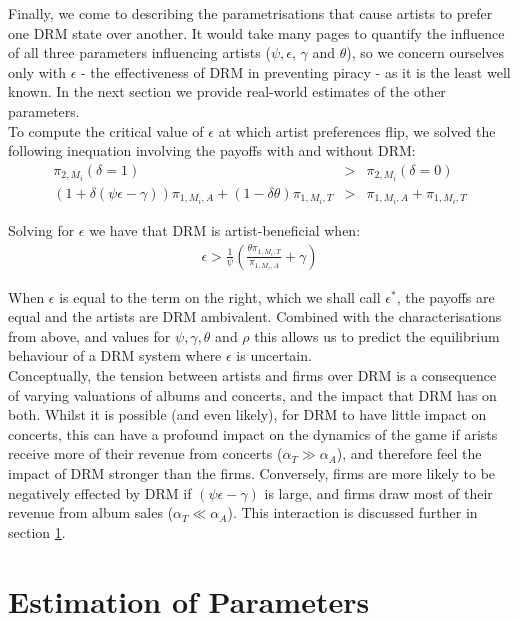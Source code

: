 \documentclass[a4paper,12pt]{article}
\numberwithin{equation}{section}
\newcommand{\artistpayoff}[2]{\pi_{#1, M_{#2}}}
\newcommand{\artistalbum}[2]{\pi_{#1, M_{#2}, A}}
\newcommand{\artistticket}[2]{\pi_{#1, M_{#2}, T}}
\newcommand{\drminf}{(\psi \epsilon - \gamma)}
\begin{document}
Finally, we come to describing the parametrisations that cause artists to prefer one DRM state over another. It would take many pages to quantify the influence of all three parameters influencing artists ($\psi, \epsilon$, $\gamma$ and $\theta$), so we concern ourselves only with $\epsilon$ - the effectiveness of DRM in preventing piracy - as it is the least well known. In the next section we provide real-world estimates of the other parameters.\\

To compute the critical value of $\epsilon$ at which artist preferences flip, we solved the following inequation involving the payoffs with and without DRM:
\begin{eqnarray*}
\artistpayoff{2}{i}(\delta = 1) & > & \artistpayoff{2}{i}(\delta = 0)\\
(1 + \delta \drminf) \artistalbum{1}{i} + (1 - \delta \theta) \artistticket{1}{i} & > & \artistalbum{1}{i} + \artistticket{1}{i}
\end{eqnarray*}

Solving for $\epsilon$ we have that DRM is artist-beneficial when:
\begin{eqnarray}
\epsilon > \frac{1}{\psi} \left( \frac{\theta \artistticket{1}{i}}{\artistalbum{1}{i}} + \gamma \right)
\end{eqnarray}

When $\epsilon$ is equal to the term on the right, which we shall call $\epsilon^*$, the payoffs are equal and the artists are DRM ambivalent. Combined with the characterisations from above, and values for $\psi, \gamma, \theta$ and $\rho$ this allows us to predict the equilibrium behaviour of a DRM system where $\epsilon$ is uncertain.\\

Conceptually, the tension between artists and firms over DRM is a consequence of varying valuations of albums and concerts, and the impact that DRM has on both. Whilst it is possible (and even likely), for DRM to have little impact on concerts, this can have a profound impact on the dynamics of the game if arists receive more of their revenue from concerts ($\alpha_T \gg \alpha_A$), and therefore feel the impact of DRM stronger than the firms. Conversely, firms are more likely to be negatively effected by DRM if $\drminf$ is large, and firms draw most of their revenue from album sales ($\alpha_T \ll \alpha_A$). This interaction is discussed further in section \ref{Sec:Estimates}.

\pagebreak
\section{Estimation of Parameters} \label{Sec:Estimates}
\end{document}
